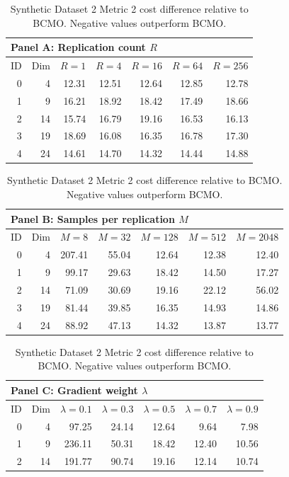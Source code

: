 \begin{table}[htbp]
\centering
\small
\setlength{\tabcolsep}{6pt}
\renewcommand{\arraystretch}{1.08}
\caption{Synthetic Dataset 2 Metric 2 cost difference relative to BCMO. Negative values outperform BCMO.}
\label{tab:synthetic_dataset_2_bcmo_difference_metric2}
\begin{tabular}{rrrrrrr}
\toprule
\multicolumn{7}{l}{\textbf{Panel A: Replication count $R$}} \\
\midrule
ID & Dim & $R=1$ & $R=4$ & $R=16$ & $R=64$ & $R=256$ \\
\midrule
0 & 4 & 12.31 & 12.51 & 12.64 & 12.85 & 12.78 \\
1 & 9 & 16.21 & 18.92 & 18.42 & 17.49 & 18.66 \\
2 & 14 & 15.74 & 16.79 & 19.16 & 16.53 & 16.13 \\
3 & 19 & 18.69 & 16.08 & 16.35 & 16.78 & 17.30 \\
4 & 24 & 14.61 & 14.70 & 14.32 & 14.44 & 14.88 \\
\bottomrule
\end{tabular}
\par\medskip
\begin{tabular}{rrrrrrr}
\toprule
\multicolumn{7}{l}{\textbf{Panel B: Samples per replication $M$}} \\
\midrule
ID & Dim & $M=8$ & $M=32$ & $M=128$ & $M=512$ & $M=2048$ \\
\midrule
0 & 4 & 207.41 & 55.04 & 12.64 & 12.38 & 12.40 \\
1 & 9 & 99.17 & 29.63 & 18.42 & 14.50 & 17.27 \\
2 & 14 & 71.09 & 30.69 & 19.16 & 22.12 & 56.02 \\
3 & 19 & 81.44 & 39.85 & 16.35 & 14.93 & 14.86 \\
4 & 24 & 88.92 & 47.13 & 14.32 & 13.87 & 13.77 \\
\bottomrule
\end{tabular}
\par\medskip
\begin{tabular}{rrrrrrr}
\toprule
\multicolumn{7}{l}{\textbf{Panel C: Gradient weight $\lambda$}} \\
\midrule
ID & Dim & $\lambda=0.1$ & $\lambda=0.3$ & $\lambda=0.5$ & $\lambda=0.7$ & $\lambda=0.9$ \\
\midrule
0 & 4 & 97.25 & 24.14 & 12.64 & 9.64 & 7.98 \\
1 & 9 & 236.11 & 50.31 & 18.42 & 12.40 & 10.56 \\
2 & 14 & 191.77 & 90.74 & 19.16 & 12.14 & 10.74 \\

\end{tabular}
\end{table}
